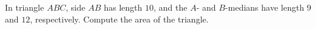 In triangle $ABC$, side $AB$ has length $10$, and the $A$- and $B$-medians have length $9$ and $12$, respectively. Compute the area of the triangle.
